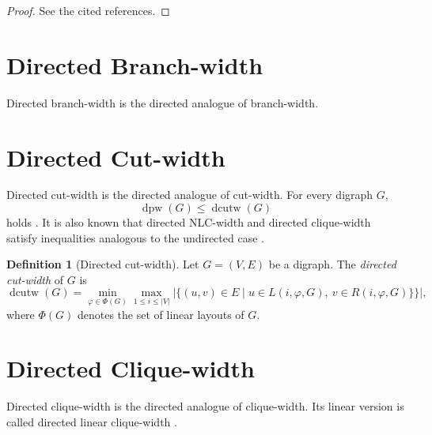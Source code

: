 \documentclass[10pt]{book}
\theoremstyle{definition}
\newtheorem{definition}[theorem]{Definition}
\begin{document}
\begin{proof}
See the cited references.
\end{proof}

\section{Directed Branch-width}
Directed branch-width \cite{68} is the directed analogue of branch-width.

\section{Directed Cut-width}
Directed cut-width \cite{69,70} is the directed analogue of cut-width.  
For every digraph \(G\),
\[
\operatorname{dpw}(G)\leq \operatorname{dcutw}(G)
\]
holds \cite{69}.  
It is also known that directed NLC-width and directed clique-width satisfy inequalities analogous to the undirected case \cite{65}.

\begin{definition}[Directed cut-width]
\cite{chudnovsky2012tournament}
Let \(G=(V,E)\) be a digraph. The \emph{directed cut-width} of \(G\) is
\[
\operatorname{dcutw}(G)=
\min_{\varphi\in \Phi(G)}
\max_{1\leq i\leq |V|}
\left|
\{(u,v)\in E\mid u\in L(i,\varphi,G),\ v\in R(i,\varphi,G)\}
\}
\right|,
\]
where \(\Phi(G)\) denotes the set of linear layouts of \(G\).
\end{definition}

\section{Directed Clique-width}
Directed clique-width \cite{courcelle2000upper,65} is the directed analogue of clique-width.  
Its linear version is called directed linear clique-width \cite{65}.
\end{document}
